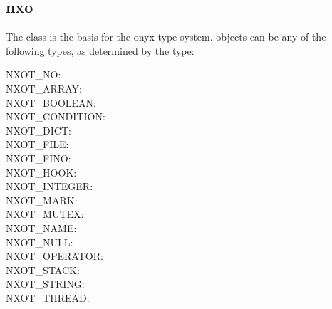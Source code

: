%
%
%
%
%              

\subsection{nxo}
\label{nxo}

The  class is the basis for the onyx type system.
 objects can be any of the following types, as determined by the
 type:
\begin{description}
\item[NXOT\_NO: ] 
\item[NXOT\_ARRAY: ] 
\item[NXOT\_BOOLEAN: ] 
\item[NXOT\_CONDITION: ] 
\item[NXOT\_DICT: ] 
\item[NXOT\_FILE: ] 
\item[NXOT\_FINO: ] 
\item[NXOT\_HOOK: ] 
\item[NXOT\_INTEGER: ] 
\item[NXOT\_MARK: ] 
\item[NXOT\_MUTEX: ] 
\item[NXOT\_NAME: ] 
\item[NXOT\_NULL: ] 
\item[NXOT\_OPERATOR: ] 
\item[NXOT\_STACK: ] 
\item[NXOT\_STRING: ] 
\item[NXOT\_THREAD: ] 
\end{description}

